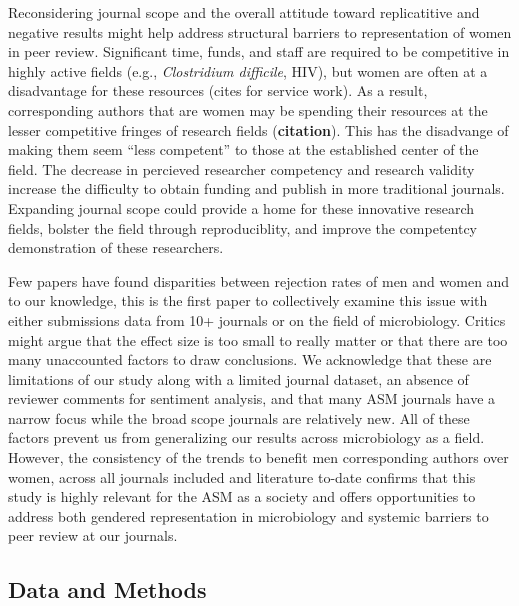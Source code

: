 \documentclass[11pt,]{article}
\begin{document}
Reconsidering journal scope and the overall attitude toward
replicatitive and negative results might help address structural
barriers to representation of women in peer review. Significant time,
funds, and staff are required to be competitive in highly active fields
(e.g., \emph{Clostridium difficile}, HIV), but women are often at a
disadvantage for these resources (cites for service work). As a result,
corresponding authors that are women may be spending their resources at
the lesser competitive fringes of research fields (\textbf{citation}).
This has the disadvange of making them seem ``less competent'' to those
at the established center of the field. The decrease in percieved
researcher competency and research validity increase the difficulty to
obtain funding and publish in more traditional journals. Expanding
journal scope could provide a home for these innovative research fields,
bolster the field through reproduciblity, and improve the competentcy
demonstration of these researchers.

Few papers have found disparities between rejection rates of men and
women and to our knowledge, this is the first paper to collectively
examine this issue with either submissions data from 10+ journals or on
the field of microbiology. Critics might argue that the effect size is
too small to really matter or that there are too many unaccounted
factors to draw conclusions. We acknowledge that these are limitations
of our study along with a limited journal dataset, an absence of
reviewer comments for sentiment analysis, and that many ASM journals
have a narrow focus while the broad scope journals are relatively new.
All of these factors prevent us from generalizing our results across
microbiology as a field. However, the consistency of the trends to
benefit men corresponding authors over women, across all journals
included and literature to-date confirms that this study is highly
relevant for the ASM as a society and offers opportunities to address
both gendered representation in microbiology and systemic barriers to
peer review at our journals.

\subsection{Data and Methods}\label{data-and-methods}
\end{document}
